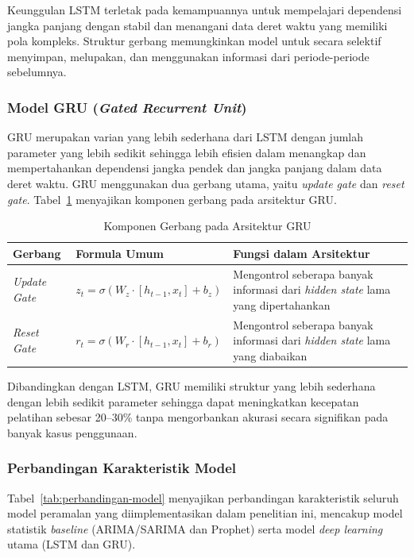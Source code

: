 Keunggulan LSTM terletak pada kemampuannya untuk mempelajari dependensi jangka panjang dengan stabil dan menangani data deret waktu yang memiliki pola kompleks. Struktur gerbang memungkinkan model untuk secara selektif menyimpan, melupakan, dan menggunakan informasi dari periode-periode sebelumnya.

\subsubsection{Model GRU (\textit{Gated Recurrent Unit})}

GRU merupakan varian yang lebih sederhana dari LSTM dengan jumlah parameter yang lebih sedikit sehingga lebih efisien dalam menangkap dan mempertahankan dependensi jangka pendek dan jangka panjang dalam data deret waktu. GRU menggunakan dua gerbang utama, yaitu \textit{update gate} dan \textit{reset gate}. Tabel~\ref{tab:gru-gates} menyajikan komponen gerbang pada arsitektur GRU.

\begin{table}[htbp]
\centering
\caption{Komponen Gerbang pada Arsitektur GRU}
\label{tab:gru-gates}
\begin{tabular}{|p{2.5cm}|p{3.5cm}|p{6.5cm}|}
\hline
\textbf{Gerbang} & \textbf{Formula Umum} & \textbf{Fungsi dalam Arsitektur} \\
\hline
\textit{Update Gate} & $z_t = \sigma(W_z \cdot [h_{t-1}, x_t] + b_z)$ & Mengontrol seberapa banyak informasi dari \textit{hidden state} lama yang dipertahankan \\
\hline
\textit{Reset Gate} & $r_t = \sigma(W_r \cdot [h_{t-1}, x_t] + b_r)$ & Mengontrol seberapa banyak informasi dari \textit{hidden state} lama yang diabaikan \\
\hline
\end{tabular}
\end{table}

Dibandingkan dengan LSTM, GRU memiliki struktur yang lebih sederhana dengan lebih sedikit parameter sehingga dapat meningkatkan kecepatan pelatihan sebesar 20--30\% tanpa mengorbankan akurasi secara signifikan pada banyak kasus penggunaan.

\subsubsection{Perbandingan Karakteristik Model}

Tabel~\ref{tab:perbandingan-model} menyajikan perbandingan karakteristik seluruh model peramalan yang diimplementasikan dalam penelitian ini, mencakup model statistik \textit{baseline} (ARIMA/SARIMA dan Prophet) serta model \textit{deep learning} utama (LSTM dan GRU).

